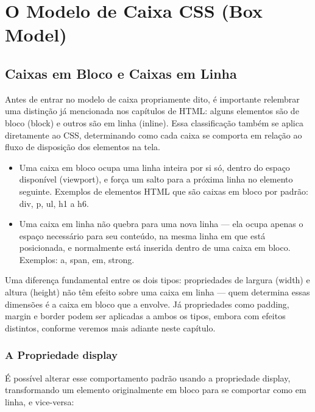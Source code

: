 \chapter{O Modelo de Caixa CSS (Box Model)}

\section{Caixas em Bloco e Caixas em Linha}

Antes de entrar no modelo de caixa propriamente dito, é importante relembrar uma distinção já mencionada nos capítulos de HTML: alguns elementos são de bloco (block) e outros são em linha (inline). Essa classificação também se aplica diretamente ao CSS, determinando como cada caixa se comporta em relação ao fluxo de disposição dos elementos na tela.

\begin{itemize}
  \item Uma caixa em bloco ocupa uma linha inteira por si só, dentro do espaço disponível (viewport), e força um salto para a próxima linha no elemento seguinte. Exemplos de elementos HTML que são caixas em bloco por padrão: div, p, ul, h1 a h6.
\end{itemize}

\begin{itemize}
  \item Uma caixa em linha não quebra para uma nova linha — ela ocupa apenas o espaço necessário para seu conteúdo, na mesma linha em que está posicionada, e normalmente está inserida dentro de uma caixa em bloco. Exemplos: a, span, em, strong.
\end{itemize}

Uma diferença fundamental entre os dois tipos: propriedades de largura (width) e altura (height) não têm efeito sobre uma caixa em linha — quem determina essas dimensões é a caixa em bloco que a envolve. Já propriedades como padding, margin e border podem ser aplicadas a ambos os tipos, embora com efeitos distintos, conforme veremos mais adiante neste capítulo.

\subsection{A Propriedade display}

É possível alterar esse comportamento padrão usando a propriedade display, transformando um elemento originalmente em bloco para se comportar como em linha, e vice-versa:


